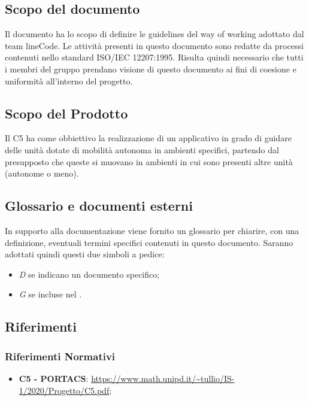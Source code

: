 \subsection{Scopo del documento}
Il documento ha lo scopo di definire le guidelines del way of working adottato dal team lineCode. Le attività presenti in questo documento sono redatte da processi contenuti nello standard ISO/IEC 12207:1995. Risulta quindi necessario che tutti i membri del gruppo prendano visione di questo documento ai fini di coesione e uniformità all'interno del progetto.

\subsection{Scopo del Prodotto}
Il  C5 ha come obbiettivo la realizzazione di un applicativo  in grado di guidare delle unità dotate di mobilità autonoma in ambienti specifici, partendo dal presupposto che queste si muovano in ambienti in cui sono presenti altre unità (autonome o meno).

\subsection{Glossario e documenti esterni}
In supporto alla documentazione viene fornito un glossario per chiarire, con una definizione, eventuali termini specifici contenuti in questo documento.
Saranno adottati quindi questi due simboli a pedice:
\begin{itemize}
	\item \textit{D} se indicano un documento specifico;
	\item \textit{G} se incluse nel .
\end{itemize}

\subsection{Riferimenti}
	\subsubsection{Riferimenti Normativi}
	\begin{itemize}
		\item \textbf{{ C5 - PORTACS}}: \url{https://www.math.unipd.it/~tullio/IS-1/2020/Progetto/C5.pdf};
	\end{itemize}

